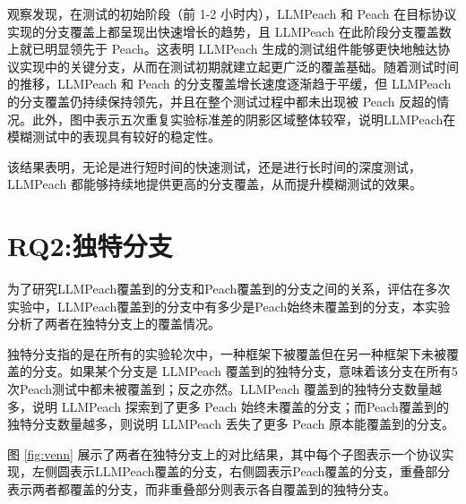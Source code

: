 观察发现，在测试的初始阶段（前 1-2 小时内），LLMPeach 和 Peach 在目标协议实现的分支覆盖上都呈现出快速增长的趋势，且 LLMPeach 在此阶段分支覆盖数上就已明显领先于 Peach。这表明 LLMPeach 生成的测试组件能够更快地触达协议实现中的关键分支，从而在测试初期就建立起更广泛的覆盖基础。随着测试时间的推移，LLMPeach 和 Peach 的分支覆盖增长速度逐渐趋于平缓，但 LLMPeach
的分支覆盖仍持续保持领先，并且在整个测试过程中都未出现被 Peach 反超的情况。此外，图中表示五次重复实验标准差的阴影区域整体较窄，说明LLMPeach在模糊测试中的表现具有较好的稳定性。

该结果表明，无论是进行短时间的快速测试，还是进行长时间的深度测试，LLMPeach 都能够持续地提供更高的分支覆盖，从而提升模糊测试的效果。


\section{RQ2:独特分支}

为了研究LLMPeach覆盖到的分支和Peach覆盖到的分支之间的关系，评估在多次实验中，LLMPeach覆盖到的分支中有多少是Peach始终未覆盖到的分支，本实验分析了两者在独特分支上的覆盖情况。

独特分支指的是在所有的实验轮次中，一种框架下被覆盖但在另一种框架下未被覆盖的分支。如果某个分支是 LLMPeach 覆盖到的独特分支，意味着该分支在所有5次Peach测试中都未被覆盖到；反之亦然。LLMPeach 覆盖到的独特分支数量越多，说明 LLMPeach 探索到了更多 Peach 始终未覆盖的分支；而Peach覆盖到的独特分支数量越多，则说明 LLMPeach 丢失了更多 Peach 原本能覆盖到的分支。

图 \ref{fig:venn} 展示了两者在独特分支上的对比结果，其中每个子图表示一个协议实现，左侧圆表示LLMPeach覆盖的分支，右侧圆表示Peach覆盖的分支，重叠部分表示两者都覆盖的分支，而非重叠部分则表示各自覆盖到的独特分支。

